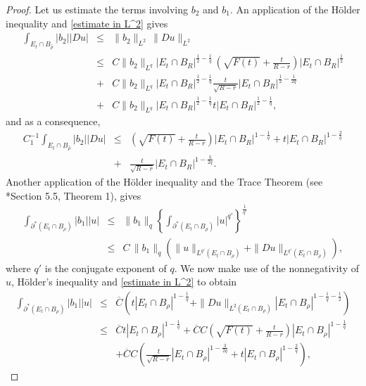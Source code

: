 \documentclass[12pt,a4paper]{amsart}
\numberwithin{equation}{section} %
\theoremstyle{definition}
\theoremstyle{remark}
\begin{document}
\begin{proof}
Let us estimate the terms involving $b_2$ and $b_1$. An application of the H\"older inequality and \eqref{estimate in L^2} gives
\begin{eqnarray*}
    \int_{E_t \cap B_{\hat{\rho}}}|b_2||Du|
    & \leq & \|b_2\|_{L^2}\, \|Du\|_{L^{2}}\\
    & \leq & C \|b_2\|_{L^{q}}|E_t \cap B_R|^{\frac{1}{2} - \frac{1}{q}}  \,\left(\sqrt{F(t)} +\frac{t}{R-r} \right)|E_t \cap B_R|^{\frac{1}{2}}\\
    & + &  C \|b_2\|_{L^{q}}|E_t \cap B_R|^{\frac{1}{2} - \frac{1}{q}}\frac{t}{\sqrt{R-r}}|E_t \cap B_R|^{\frac{1}{2} - \frac{1}{2q}}\\
    & + &  C \|b_2\|_{L^{q}}|E_t \cap B_R|^{\frac{1}{2} - \frac{1}{q}}t|E_t \cap B_R|^{\frac{1}{2} - \frac{1}{q}},
\end{eqnarray*}
and as a consequence,
\begin{eqnarray*}
    C_1^{-1}\int_{E_t \cap B_{\hat{\rho}}}|b_2||Du| & \leq &   \left(\sqrt{F(t)} +\frac{t}{R-r} \right)|E_t \cap B_R|^{1 - \frac{1}{q}} + t|E_t \cap B_R|^{1 - \frac{2}{q}}\\
    & + &  \frac{t}{\sqrt{R-r}}|E_t \cap B_R|^{1 - \frac{3}{2q}}.
\end{eqnarray*}
Another application of the H\"older inequality and the Trace Theorem (see \cite{EV}*{Section 5.5, Theorem 1}), gives
\begin{eqnarray*}
    \int_{\partial^* \left(E_t \cap B_{\rho}\right)} |b_1||u| & \leq & \|b_1\|_{q} \left\{\int_{\partial^* \left(E_t \cap B_{\rho}\right)} |u|^{q'}\right\}^{\frac{1}{q'}}\\
    & \leq & C\, \|b_1\|_{q} \left(\|u\|_{L^{q'}(E_t \cap B_{\rho})} + \|Du\|_{L^{q'}(E_t \cap B_{\rho})}\right),
\end{eqnarray*}
where $q'$ is the conjugate exponent of $q$. We now make use of the nonnegativity of $u$, H\"older's inequality and \eqref{estimate in L^2} to obtain
\begin{eqnarray*}
    \int_{\partial^* \left(E_t \cap B_{\rho}\right)} |b_1||u| & \leq & \overline{C} \left(t|E_t \cap B_\rho|^{1 - \frac{1}{q}} + \|Du\|_{L^2(E_t \cap B_\rho)}|E_t \cap B_\rho|^{1 - \frac{1}{q} - \frac{1}{2}} \right)\\
    & \leq & \overline{C}t|E_t \cap B_\rho|^{1 - \frac{1}{q}} + \overline{C}C\left(\sqrt{F(t)} + \frac{t}{R-r} \right)|E_t \cap B_\rho|^{1 - \frac{1}{q}}\\
    & & +  \overline{C}C\left(\frac{t}{\sqrt{R-r}}|E_t \cap B_\rho|^{1 - \frac{3}{2q}} + t|E_t \cap B_\rho|^{1 - \frac{2}{q}} \right),

\end{eqnarray*}
\end{proof}
\end{document}

